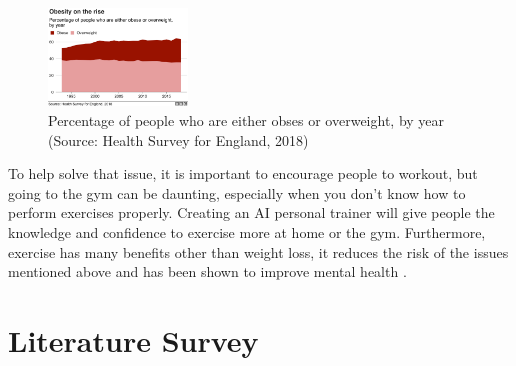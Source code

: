 \documentclass[runningheads]{llncs}
\begin{document}
        \begin{figure}[htbp]
            \centering
            \includegraphics[width=0.33\textwidth]{figures/obesity.png}
            \caption{Percentage of people who are either obses or overweight, by year (Source: Health Survey for England, 2018)}\label{fig:obesity}
        \end{figure}

        To help solve that issue, it is important to encourage people to workout, but going to the gym can be daunting, especially when you don't know how to perform exercises properly. Creating an AI personal trainer will give people the knowledge and confidence to exercise more at home or the gym. Furthermore, exercise has many benefits other than weight loss, it reduces the risk of the issues mentioned above and has been shown to improve mental health \parencite{NHS-benefits}.

    


\section{Literature Survey} %
\end{document}
